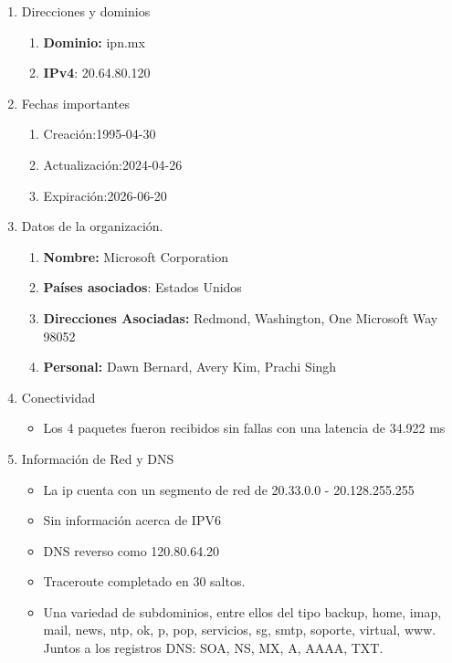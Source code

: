 \begin{enumerate}
    \item Direcciones y dominios
    \begin{enumerate}
        \item \textbf{Dominio:} ipn.mx
        \item \textbf{IPv4}: 20.64.80.120
    \end{enumerate}
    \item Fechas importantes
    \begin{enumerate}
        \item Creación:1995-04-30
        \item Actualización:2024-04-26
        \item Expiración:2026-06-20
    \end{enumerate}
    \item Datos de la organización.

    \begin{enumerate}
        \item \textbf{Nombre:} Microsoft Corporation
        \item \textbf{Países asociados}: Estados Unidos 
        \item \textbf{Direcciones Asociadas:} Redmond, Washington, One Microsoft Way 98052
        \item \textbf{Personal:} Dawn Bernard, Avery Kim, Prachi Singh
    \end{enumerate}

    \item Conectividad
    \begin{itemize}
        \item Los 4 paquetes fueron recibidos sin fallas con una latencia de 34.922 ms 
    \end{itemize}

    \item Información de Red y DNS
    \begin{itemize}
        \item La ip cuenta con un segmento de red de 20.33.0.0 - 20.128.255.255
        \item Sin información acerca de IPV6
        \item DNS reverso como 120.80.64.20
        \item Traceroute completado en 30 saltos.
        \item Una variedad de subdominios, entre ellos del tipo backup, home, imap, mail, news, ntp, ok, p, pop, servicios, sg, smtp, soporte, virtual, www. Juntos a los registros DNS: SOA, NS, MX, A, AAAA, TXT.


\end{itemize}
\end{enumerate}
